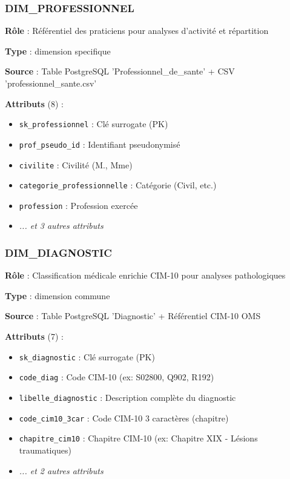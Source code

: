 \subsubsection{DIM_PROFESSIONNEL}

\textbf{Rôle} : Référentiel des praticiens pour analyses d'activité et répartition

\textbf{Type} : dimension specifique

\textbf{Source} : Table PostgreSQL 'Professionnel_de_sante' + CSV 'professionnel_sante.csv'

\textbf{Attributs} (8) :
\begin{itemize}[leftmargin=*]
    \item \texttt{sk_professionnel} : Clé surrogate (PK)
    \item \texttt{prof_pseudo_id} : Identifiant pseudonymisé
    \item \texttt{civilite} : Civilité (M., Mme)
    \item \texttt{categorie_professionnelle} : Catégorie (Civil, etc.)
    \item \texttt{profession} : Profession exercée
    \item \textit{... et 3 autres attributs}
\end{itemize}

\subsubsection{DIM_DIAGNOSTIC}

\textbf{Rôle} : Classification médicale enrichie CIM-10 pour analyses pathologiques

\textbf{Type} : dimension commune

\textbf{Source} : Table PostgreSQL 'Diagnostic' + Référentiel CIM-10 OMS

\textbf{Attributs} (7) :
\begin{itemize}[leftmargin=*]
    \item \texttt{sk_diagnostic} : Clé surrogate (PK)
    \item \texttt{code_diag} : Code CIM-10 (ex: S02800, Q902, R192)
    \item \texttt{libelle_diagnostic} : Description complète du diagnostic
    \item \texttt{code_cim10_3car} : Code CIM-10 3 caractères (chapitre)
    \item \texttt{chapitre_cim10} : Chapitre CIM-10 (ex: Chapitre XIX - Lésions traumatiques)
    \item \textit{... et 2 autres attributs}
\end{itemize}

